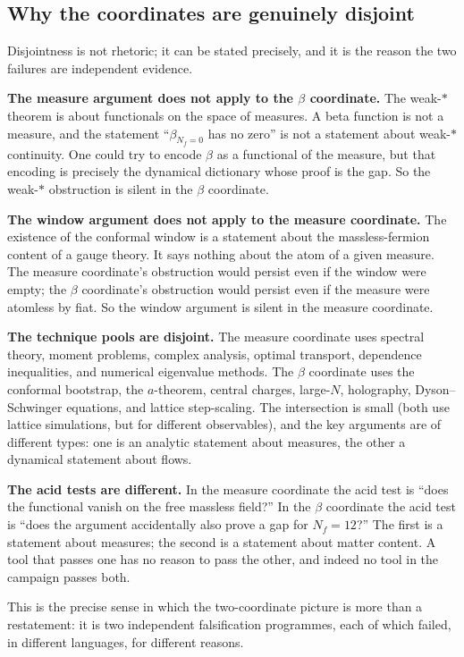 \subsection{Why the coordinates are genuinely disjoint}
\label{sec:disjoint}

Disjointness is not rhetoric; it can be stated precisely, and it is the reason the two failures
are independent evidence.

\textbf{The measure argument does not apply to the $\beta$ coordinate.} The weak-$*$ theorem is
about functionals on the space of measures. A beta function is not a measure, and the statement
``$\beta_{N_f=0}$ has no zero'' is not a statement about weak-$*$ continuity. One could try to
encode $\beta$ as a functional of the measure, but that encoding is precisely the dynamical
dictionary whose proof is the gap. So the weak-$*$ obstruction is silent in the $\beta$
coordinate.

\textbf{The window argument does not apply to the measure coordinate.} The existence of the
conformal window is a statement about the massless-fermion content of a gauge theory. It says
nothing about the atom of a given measure. The measure coordinate's obstruction would persist
even if the window were empty; the $\beta$ coordinate's obstruction would persist even if the
measure were atomless by fiat. So the window argument is silent in the measure coordinate.

\textbf{The technique pools are disjoint.} The measure coordinate uses spectral theory, moment
problems, complex analysis, optimal transport, dependence inequalities, and numerical
eigenvalue methods. The $\beta$ coordinate uses the conformal bootstrap, the $a$-theorem,
central charges, large-$N$, holography, Dyson--Schwinger equations, and lattice step-scaling.
The intersection is small (both use lattice simulations, but for different observables), and the
key arguments are of different types: one is an analytic statement about measures, the other a
dynamical statement about flows.

\textbf{The acid tests are different.} In the measure coordinate the acid test is ``does the
functional vanish on the free massless field?'' In the $\beta$ coordinate the acid test is ``does
the argument accidentally also prove a gap for $N_f=12$?'' The first is a statement about
measures; the second is a statement about matter content. A tool that passes one has no reason to
pass the other, and indeed no tool in the campaign passes both.

This is the precise sense in which the two-coordinate picture is more than a restatement: it is
two independent falsification programmes, each of which failed, in different languages, for
different reasons.

